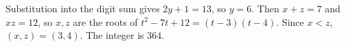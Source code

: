 Substitution into the digit sum gives $2y+1=13$, so $y=6$. Then $x+z=7$ and $xz=12$, so $x,z$ are the roots of $t^2-7t+12=(t-3)(t-4)$. Since $x<z$, $(x,z)=(3,4)$. The integer is $\boxed{364}$.
